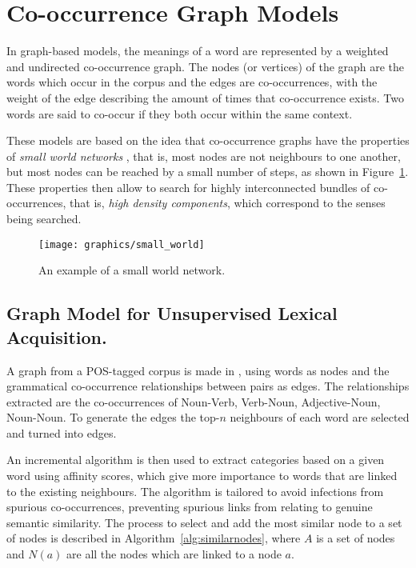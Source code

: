 \section{Co-occurrence Graph Models}

In graph-based models, the meanings of a word are represented by a weighted
and undirected co-occurrence graph. The nodes (or vertices) of the graph are the
words which occur in the corpus and the edges are co-occurrences, with the
weight of the edge describing the amount of times that co-occurrence exists. Two
words are said to co-occur if they both occur within the same context.

These models are based on the idea that co-occurrence graphs have the properties
of \textit{small world networks} \cite{veronis2004hyperlex}, that is, most nodes
are not neighbours to one another, but most nodes can be reached by a small
number of steps, as shown in Figure~\ref{fig:small-world}. These properties
then allow to search for highly interconnected bundles of co-occurrences, that
is, \textit{high density components}, which correspond to the senses being
searched.

\begin{figure}[ht]
 \caption{An example of a small world network.}
 \label{fig:small-world}
 \centering
 \texttt{[image: graphics/small\_world]}
\end{figure}

\subsection{Graph Model for Unsupervised Lexical Acquisition.}

A graph from a \ac{POS}-tagged corpus is made in \cite{widdows2002graph}, using
words as nodes and the grammatical co-occurrence relationships between pairs as
edges. The relationships extracted are the co-occurrences of Noun-Verb,
Verb-Noun, Adjective-Noun, Noun-Noun. To generate the edges the top-$n$
neighbours of each word are selected and turned into edges.

An incremental algorithm is then used to extract categories based on a given
word using affinity scores, which give more importance to words that are linked
to the existing neighbours. The algorithm is tailored to avoid infections from
spurious co-occurrences, preventing spurious links from relating to genuine
semantic similarity. The process to select and add the most similar node to a
set of nodes is described in Algorithm~\ref{alg:similarnodes}, where $A$ is a
set of nodes and $N(a)$ are all the nodes which are linked to a node $a$.


